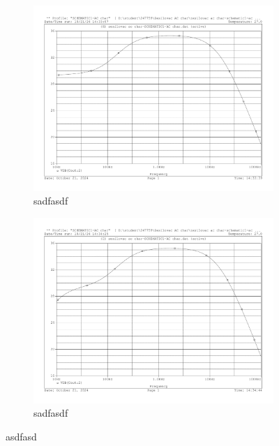 \documentclass[a4paper, czech]{article}
\begin{document}
\begin{figure}[H]
    \centering
    \begin{subfigure}{0.49\textwidth}
        \centering
        \includegraphics[width=\textwidth]{charakteristiky/uloha3_Cin_5krat_vetsi_500n.pdf}
        \caption{sadfasdf}
    \end{subfigure}
    \hfill
    \begin{subfigure}{0.49\textwidth}
        \centering
        \includegraphics[width=\textwidth]{charakteristiky/uloha3_Cin_5krat_mensi_20n.pdf}
        \caption{sadfasdf}
    \end{subfigure}
    \caption{asdfasd}
\end{figure}
\end{document}
